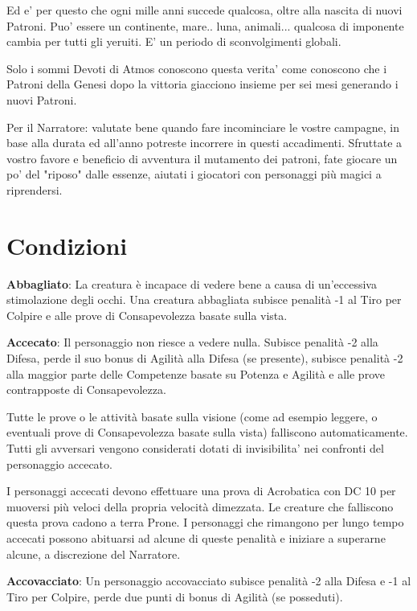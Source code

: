 \documentclass[a4paper,11pt,twoside,openany]{book}
\begin{document}
Ed e' per questo che ogni mille anni succede qualcosa, oltre alla nascita di nuovi Patroni. Puo' essere un continente, mare.. luna, animali... qualcosa di imponente cambia per tutti gli yeruiti. E' un periodo di sconvolgimenti globali.

Solo i sommi Devoti di Atmos conoscono questa verita' come conoscono che i Patroni della Genesi dopo la vittoria giacciono insieme per sei mesi generando i nuovi Patroni.

\bigskip

Per il Narratore: valutate bene quando fare incominciare le vostre campagne, in base alla durata ed all'anno potreste incorrere in questi accadimenti.
Sfruttate a vostro favore e beneficio di avventura il mutamento dei patroni, fate giocare un po' del "riposo" dalle essenze, aiutati i giocatori con personaggi più magici a riprendersi.

\pagebreak

\section{Condizioni}

\label{condizioni}

\textbf{Abbagliato}: La creatura è incapace di vedere bene a causa di un'eccessiva stimolazione degli occhi. Una creatura abbagliata subisce penalità -1 al Tiro per Colpire e alle prove di Consapevolezza basate sulla vista.

\textbf{Accecato}: Il personaggio non riesce a vedere nulla. Subisce penalità -2 alla Difesa, perde il suo bonus di Agilità alla Difesa (se presente), subisce penalità -2 alla maggior parte delle Competenze basate su Potenza e Agilità e alle prove contrapposte di Consapevolezza.

Tutte le prove o le attività basate sulla visione (come ad esempio leggere, o eventuali prove di Consapevolezza basate sulla vista) falliscono automaticamente. Tutti gli avversari vengono considerati dotati di invisibilita' nei confronti del personaggio accecato.

I personaggi accecati devono effettuare una prova di Acrobatica con DC 10 per muoversi più veloci della propria velocità dimezzata. Le creature che falliscono questa prova cadono a terra Prone. I personaggi che rimangono per lungo tempo accecati possono abituarsi ad alcune di queste penalità e iniziare a superarne alcune, a discrezione del Narratore.

\textbf{Accovacciato}: Un personaggio accovacciato subisce penalità -2 alla Difesa e -1 al Tiro per Colpire, perde due punti di bonus di Agilità (se posseduti).
\end{document}
